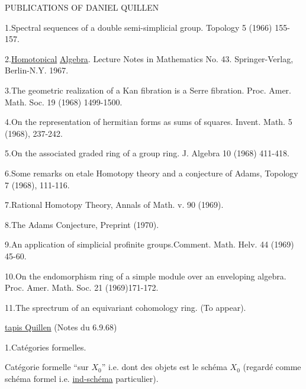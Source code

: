 \begin{center}
PUBLICATIONS OF DANIEL QUILLEN
\end{center}

1.\quad Spectral sequences of a double semi-simplicial group. Topology 5 (1966) 155-157.

2.\quad \uline{Homotopical} \uline{Algebra}. Lecture Notes in Mathematics No. 43. Springer-Verlag, Berlin-N.Y. 1967.

3.\quad The geometric realization of a Kan fibration is a Serre fibration. Proc. Amer. Math. Soc. 19 (1968) 1499-1500.

4.\quad On the representation of hermitian forms as sums of squares. Invent. Math. 5 (1968), 237-242.

5.\quad On the associated graded ring of a group ring. J. Algebra 10 (1968) 411-418.

6.\quad Some remarks on etale Homotopy theory and a conjecture of Adams, Topology 7 (1968), 111-116.

7.\quad Rational Homotopy Theory, Annals of Math. v. 90 (1969).

8.\quad The Adams Conjecture, Preprint (1970).

9.\quad An application of simplicial profinite groups.Comment. Math. Helv. 44 (1969) 45-60.

10.\quad On the endomorphism ring of a simple module over an enveloping algebra. Proc. Amer. Math. Soc. 21 (1969)171-172.

11.\quad The sprectrum of an equivariant cohomology ring. (To appear).


\begin{flushright}
\uline{tapis Quillen} (Notes du 6.9.68)
\end{flushright}

1.\quad Catégories formelles.

Catégorie formelle  ``sur $X_0$'' i.e. dont  des objets est le schéma $X_0$ (regardé comme  schéma formel i.e. \uline{ind-schéma} particulier).

